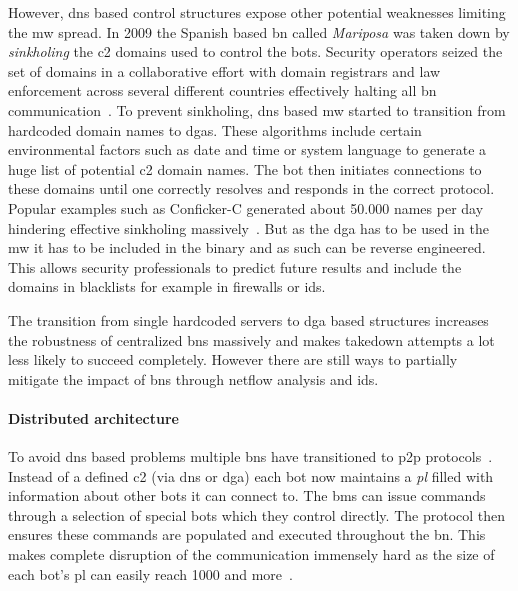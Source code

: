 However, \gls{dns} based control structures expose other potential weaknesses limiting the \gls{mw} spread.
In 2009 the Spanish based \gls{bn} called \emph{Mariposa} was taken down by \emph{sinkholing} the \gls{c2} domains used to control the \glspl{bot}.
Security operators seized the set of domains in a collaborative effort with domain registrars and law enforcement across several different countries effectively halting all \gls{bn} communication~\cite{krebs2010mariposa, nadji2013beheading}.
To prevent sinkholing, \gls{dns} based \gls{mw} started to transition from hardcoded domain names to \glspl{dga}.
These algorithms include certain environmental factors such as date and time or system language to generate a huge list of potential \gls{c2} domain names.
The \gls{bot} then initiates connections to these domains until one correctly resolves and responds in the correct protocol.
Popular examples such as Conficker-C generated about 50.000 names per day hindering effective sinkholing massively~\cite{porras2009conficker}.
But as the \gls{dga} has to be used in the \gls{mw} it has to be included in the binary and as such can be reverse engineered.
This allows security professionals to predict future results and include the domains in blacklists for example in firewalls or \gls{ids}.

The transition from single hardcoded servers to \gls{dga} based structures increases the robustness of centralized \glspl{bn} massively and makes takedown attempts a lot less likely to succeed completely.
However there are still ways to partially mitigate the impact of \glspl{bn} through netflow analysis and \gls{ids}.


\paragraph*{Distributed architecture}
To avoid \gls{dns} based problems multiple \glspl{bn} have transitioned to \gls{p2p} protocols~\cite{dittrich2008new}.
Instead of a defined \gls{c2} (via \gls{dns} or \gls{dga}) each \gls{bot} now maintains a \emph{\gls{pl}} filled with information about other \glspl{bot} it can connect to.
The \glspl{bm} can issue commands through a selection of special \glspl{bot} which they control directly.
The protocol then ensures these commands are populated and executed throughout the \gls{bn}.
This makes complete disruption of the communication immensely hard as the size of each bot's \gls{pl} can easily reach 1000 and more~\cite{haas2016resilience}.

